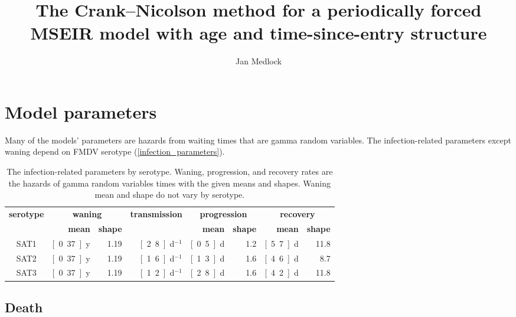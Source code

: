 \documentclass[USenglish]{article}
\title{
  The Crank--Nicolson method for a periodically forced MSEIR
  model with age and time-since-entry structure
}
\author{Jan Medlock}
\begin{document}
\maketitle


\section{Model parameters}

Many of the models' parameters are hazards from waiting times that are
gamma random variables. The infection-related parameters except waning
depend on FMDV serotype (\autoref{infection_parameters}).


\begin{table}
  \centering
  \begin{tabular}{|c|rr|r|rr|rr|}
    \hline
    \multirow{2}{*}{\textbf{serotype}}
    & \multicolumn{2}{|c|}{\textbf{waning}}
    & \multirow{2}{*}{\textbf{transmission}}
    & \multicolumn{2}{|c|}{\textbf{progression}}
    & \multicolumn{2}{|c|}{\textbf{recovery}}
    \\
    & \textbf{mean} & \textbf{shape}
    &
    & \textbf{mean} & \textbf{shape}
    & \textbf{mean} & \textbf{shape}
    \\
    \hline
    SAT1
    & \unit[0.37]{y} & 1.19
    & \unit[2.8]{d$^{-1}$}
    & \unit[0.5]{d} & 1.2
    & \unit[5.7]{d} & 11.8
    \\
    SAT2
    & \unit[0.37]{y} & 1.19
    & \unit[1.6]{d$^{-1}$}
    & \unit[1.3]{d} & 1.6
    & \unit[4.6]{d} & 8.7
    \\
    SAT3
    & \unit[0.37]{y} & 1.19
    & \unit[1.2]{d$^{-1}$}
    & \unit[2.8]{d} & 1.6
    & \unit[4.2]{d} & 11.8
    \\
    \hline
  \end{tabular}
  \caption{The infection-related parameters by serotype. Waning,
    progression, and recovery rates are the hazards of gamma random
    variables times with the given means and shapes. Waning mean and
    shape do not vary by serotype.}
  \label{infection_parameters}
\end{table}


\subsection{Death}
\end{document}
